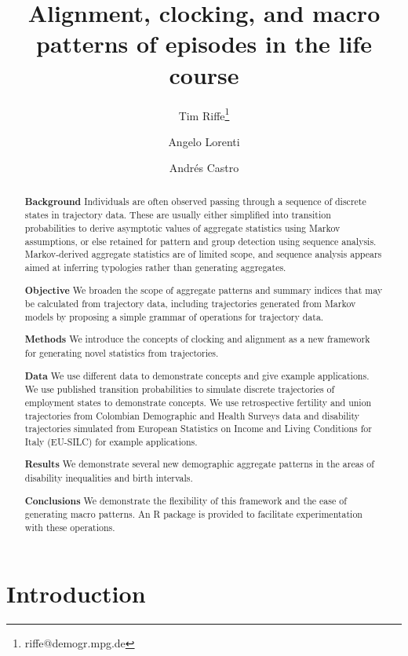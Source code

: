 \documentclass{article}
\newcommand{\absdiv}[1]{%
  \par\addvspace{.5\baselineskip}%
  \noindent\textbf{#1}\quad\ignorespaces
}
\begin{document}
\title{Alignment, clocking, and macro patterns of episodes in the life course}
\author[1]{Tim Riffe\thanks{riffe@demogr.mpg.de}}
\author[1]{Angelo Lorenti}
\author[1]{Andr\'{e}s Castro}
\maketitle

\begin{abstract}

\absdiv{Background}Individuals are often observed passing through a sequence of discrete states in trajectory data. These are usually either simplified into transition probabilities to derive asymptotic values of aggregate statistics using Markov assumptions, or else retained for pattern and group detection using sequence analysis. Markov-derived aggregate statistics are of limited scope, and sequence analysis appears aimed at inferring typologies rather than generating aggregates.
\absdiv{Objective}We broaden the scope of aggregate patterns and summary indices that may be calculated from trajectory data, including trajectories generated from Markov models by proposing a simple grammar of operations for trajectory data.
\absdiv{Methods}We introduce the concepts of clocking and alignment as a new framework for generating novel statistics from trajectories. 
\absdiv{Data}We use different data to demonstrate concepts and give example applications. We use published transition probabilities to simulate discrete trajectories of employment states to demonstrate concepts. We use retrospective fertility and union trajectories from Colombian Demographic and Health Surveys data and disability trajectories simulated from European Statistics on Income and Living Conditions for Italy (EU-SILC) for example applications.
\absdiv{Results}We demonstrate  several new demographic aggregate patterns in the areas of disability inequalities and birth intervals.
\absdiv{Conclusions}We demonstrate the flexibility of this framework and the ease of generating macro patterns. An R package is provided to facilitate experimentation with these operations.
\end{abstract}

\doublespacing
\section{Introduction}
\end{document}
